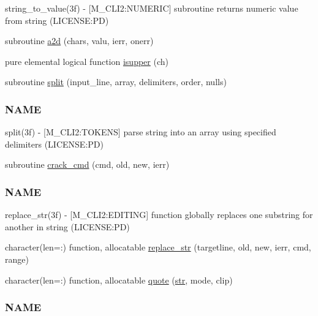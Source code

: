 \begin{DoxyCompactItemize}
\begin{DoxyCompactList}
string\+\_\+to\+\_\+value(3f) -\/ \mbox{[}M\+\_\+\+C\+L\+I2\+:N\+U\+M\+E\+R\+IC\mbox{]} subroutine returns numeric value from string (L\+I\+C\+E\+N\+SE\+:PD) \end{DoxyCompactList}\item 
subroutine \mbox{\hyperlink{namespacem__cli2_ad9e1de0ea9d2b4ed758b2a76bf143bd2}{a2d}} (chars, valu, ierr, onerr)
\item 
pure elemental logical function \mbox{\hyperlink{namespacem__cli2_ad33ebc8ed3953d8cd91bd8c90a49b59d}{isupper}} (ch)
\item 
subroutine \mbox{\hyperlink{namespacem__cli2_a6578e29ee4dc56651528e7e0acd29665}{split}} (input\+\_\+line, array, delimiters, order, nulls)
\begin{DoxyCompactList}\small\item\em \subsubsection*{N\+A\+ME}

split(3f) -\/ \mbox{[}M\+\_\+\+C\+L\+I2\+:T\+O\+K\+E\+NS\mbox{]} parse string into an array using specified delimiters (L\+I\+C\+E\+N\+SE\+:PD) \end{DoxyCompactList}\item 
subroutine \mbox{\hyperlink{namespacem__cli2_a710b26995119aee101959555b1bac8e2}{crack\+\_\+cmd}} (cmd, old, new, ierr)
\begin{DoxyCompactList}\small\item\em \subsubsection*{N\+A\+ME}

replace\+\_\+str(3f) -\/ \mbox{[}M\+\_\+\+C\+L\+I2\+:E\+D\+I\+T\+I\+NG\mbox{]} function globally replaces one substring for another in string (L\+I\+C\+E\+N\+SE\+:PD) \end{DoxyCompactList}\item 
character(len=\+:) function, allocatable \mbox{\hyperlink{namespacem__cli2_a8f65cf1b227d837d89437368c660666f}{replace\+\_\+str}} (targetline, old, new, ierr, cmd, range)
\item 
character(len=\+:) function, allocatable \mbox{\hyperlink{namespacem__cli2_a63f81a2c027eb5f3e0a77167ac29fc73}{quote}} (\mbox{\hyperlink{interfacem__cli2_1_1str}{str}}, mode, clip)
\begin{DoxyCompactList}\small\item\em \subsubsection*{N\+A\+ME}


\end{DoxyCompactList}
\end{DoxyCompactItemize}
